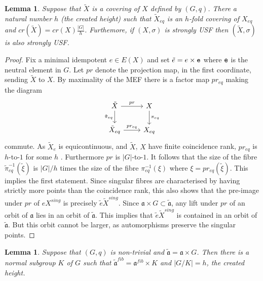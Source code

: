 \documentclass[10pt,a4paper]{amsart}
\newtheorem{lemma}[theorem]{Lemma}
\numberwithin{equation}{section}
\newcommand{\Xe}{X_{eq}}
\newcommand{\aut}{{\mathfrak a}}
\newcommand{\pe}{\pi_{eq}}
\begin{document}
\begin{lemma} Suppose that $\tilde X$ is a covering of $X$ defined by $(G,q)$.  There a natural number $h$ (the created height) such that 
$ \tilde X_{eq}$ is an $h$-fold covering of $\Xe$ and $ cr(\tilde X) = cr (X)\frac{|G|}{h} $.
Furthemore, if $(X,\sigma)$ is strongly USF then $(\tilde X,\sigma)$ is also strongly USF.
\end{lemma}
\begin{proof} 
Fix a minimal idempotent $e\in E(X)$ and set $\tilde e = e\times \tt{e}$  where $\tt{e}$ is the neutral element in $G$.   
Let $pr$ denote the projection map, in the first coordinate, sending $\tilde X$ to $X$.
By maximality of the MEF there is a factor map $pr_{eq}$ making 
the  diagram 
\[
\begin{tikzcd}
\tilde X \arrow{r}{pr} \arrow[swap]{d}{\tilde \pi_{eq}} & X \arrow{d}{\pe} \\
\tilde X_{eq}\arrow{r}{pr_{eq}}  & \Xe
\end{tikzcd}
\]
commute.
As $\tilde X_e$ is equicontinuous, and $\tilde X$, $X$ have finite coincidence rank, ${pr_{eq}} $ is $h$-to-$1$ for some $h$  \cite{Sacker-Sell:1974}. Furthermore $pr$ is $|G|$-to-$1$. It follows that the size of the fibre $\tilde\pi_{eq}^{-1}(\tilde \xi)$ is $|G|/h$ times the size of the fibre $\pe^{-1}(\xi)$ where $\xi = pr_{eq}(\tilde \xi)$. This implies the first statement. Since singular fibres are characterised by having strictly more points than the coincidence  rank, this also shows that the pre-image under $pr$ of $eX^{sing}$ is precisely $\tilde e \tilde X^{sing}$. Since $\aut\times G\subset \tilde\aut$, any lift under $pr$ of an orbit of $\aut$ lies in an orbit of $\tilde\aut$.  This implies that $\tilde e \tilde X^{sing}$ is contained in an orbit of $\tilde\aut$. But this orbit cannot be larger, as automorphisms preserve the singular points. 
\end{proof}
\begin{lemma}\label{lem-K}
Suppose that $(G,q)$ is non-trivial and $\tilde\aut = \aut\times G$. Then there is a normal subgroup $K$ of $G$ such that $\tilde\aut^{fib} = \aut^{fib}\times K$ and $|G/K| = h$, the created height.   
\end{lemma}
\end{document}
